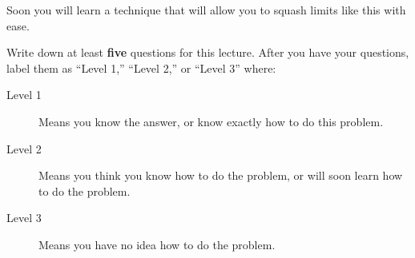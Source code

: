 \documentclass{ximera}
\begin{document}
Soon you will learn a technique that will allow you to squash limits
like this with ease.

\begin{xarmaBoost}
  Write down at least \textbf{five} questions for this lecture. After
  you have your questions, label them as ``Level 1,'' ``Level 2,'' or
  ``Level 3'' where:
\begin{description}
\item[Level 1] Means you know the answer, or know exactly how to do
  this problem.
\item[Level 2] Means you think you know how to do the problem, or will
  soon learn how to do the problem.
\item[Level 3] Means you have no idea how to do the problem.
\end{description}
\begin{freeResponse}
\end{freeResponse}
\end{xarmaBoost}
\end{document}
